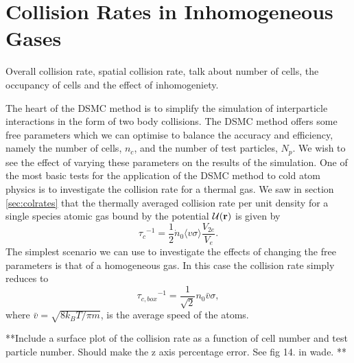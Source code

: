 
\section{Collision Rates in Inhomogeneous Gases}

Overall collision rate, spatial collision rate, talk about number of cells, the occupancy of cells and the effect of inhomogeniety.

The heart of the DSMC method is to simplify the simulation of interparticle interactions in the form of two body collisions. 
The DSMC method offers some free parameters which we can optimise to balance the accuracy and efficiency, namely the number of cells, $n_c$, and the number of test particles, $N_p$.
We wish to see the effect of varying these parameters on the results of the simulation.
One of the most basic tests for the application of the DSMC method to cold atom physics is to investigate the collision rate for a thermal gas. 
We saw in section \ref{sec:colrates} that the thermally averaged collision rate per unit density for a single species atomic gas bound by the potential $\cal{U}(\mathbf{r})$ is given by
\begin{equation}
    {\tau_c}^{-1} = \frac{1}{2}\dot{n}_{0}\langle v\sigma \rangle \frac{V_{2e}}{V_e}.
\end{equation}
The simplest scenario we can use to investigate the effects of changing the free parameters is that of a homogeneous gas. 
In this case the collision rate simply reduces to 
\begin{equation*}
    {\tau_{c,box}}^{-1} = \frac{1}{\sqrt{2}}n_0\bar{v}\sigma,
\end{equation*}
where $\bar{v}=\sqrt{8k_{B}T/\pi m}$, is the average speed of the atoms.

**Include a surface plot of the collision rate as a function of cell number and test particle number.
Should make the z axis percentage error. See fig 14. in wade. **

